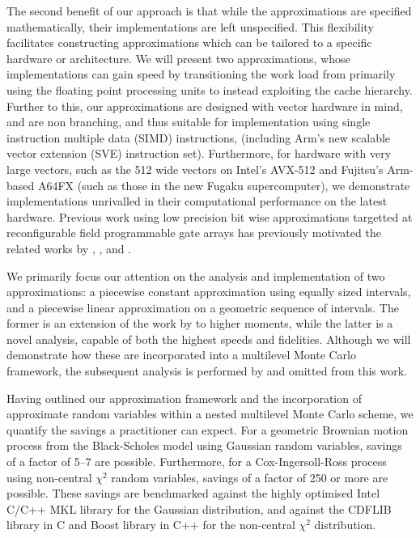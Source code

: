 \documentclass[manuscript,review]{acmart}
\begin{document}
The second benefit of our approach is that while the approximations are  specified mathematically, their implementations are left unspecified. This flexibility facilitates constructing approximations which can be tailored to a specific hardware or architecture. We will present two approximations, whose implementations can gain speed by transitioning the work load from primarily using the floating point processing units to instead exploiting the cache hierarchy. Further to this, our approximations are designed with vector hardware in mind, and are non branching, and thus suitable for implementation using single instruction multiple data (SIMD) instructions, (including Arm's new scalable vector extension (SVE) instruction set). Furthermore, for hardware with very large vectors, such as the \SI{512}{\bit} wide vectors on Intel's AVX-512 and Fujitsu's Arm-based A64FX (such as those in the new Fugaku supercomputer), we demonstrate implementations unrivalled in their computational performance on the latest hardware. Previous work using low precision bit wise approximations targetted at reconfigurable field programmable gate arrays has previously motivated the related works by \citet{brugger2014mixed}, \citet{omland2015exploiting}, and \citet{cheung2007hardware}.

We primarily focus our attention on the analysis and implementation of two approximations: a piecewise constant approximation using equally sized intervals, and a piecewise linear approximation on a geometric sequence of intervals. The former is an extension of the work by \citet[theorem~1]{giles2019random_quadrature} to higher moments, while the latter is a novel analysis, capable of both the highest speeds and fidelities. Although we will demonstrate how these are incorporated into a multilevel Monte Carlo framework, the subsequent analysis is performed by \citeauthor{giles2020approximate} \citep{giles2020approximate,sheridan2020nested} and omitted from this work. 

Having outlined our approximation framework and the incorporation of approximate random variables within a nested multilevel Monte Carlo scheme, we quantify the savings a practitioner can expect. For a geometric Brownian motion process from the Black-Scholes model \citep{black1973pricing} using Gaussian random variables, savings of a factor of 5--7 are possible. Furthermore, for a Cox-Ingersoll-Ross process \citep{cox1985theory} using non-central $ \chi^2 $ random variables, savings of a factor of 250 or more are possible. These savings are benchmarked against the highly optimised Intel C/C++ MKL library for the Gaussian distribution, and against the CDFLIB library \citep{brown1994dcdflib,burkardt2020cdflib} in C and Boost library \citep{boost2020library} in C++ for the non-central $ \chi^2 $ distribution. 
\end{document}
